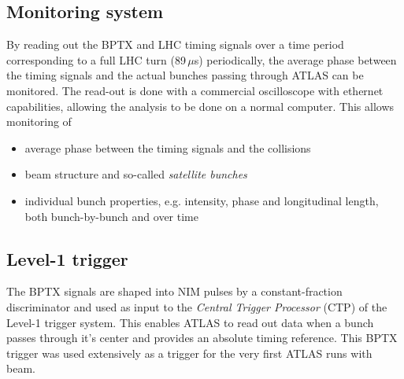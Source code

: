 \documentclass[portrait,final]{baposter}
\begin{document}
\begin{poster}
{\subsection*{Monitoring system}
By reading out the BPTX and LHC timing signals over a time period corresponding to a full LHC turn (89\,$\mu$s) periodically, the average phase between the timing signals and the actual bunches passing through ATLAS can be monitored. The read-out is done with a commercial oscilloscope with ethernet capabilities, allowing the analysis to be done on a normal computer. This allows monitoring of
\begin{itemize}
	\item \vspace{-0.5em}average phase between the timing signals and the collisions
	\item \vspace{-0.7em}beam structure and so-called \emph{satellite bunches}
	\item \vspace{-0.7em}individual bunch properties, e.g. intensity, phase and longitudinal length, both bunch-by-bunch and over time
\end{itemize}

\subsection*{Level-1 trigger}
The BPTX signals are shaped into NIM pulses by a constant-fraction discriminator and used as input to the \emph{Central Trigger Processor} (CTP) of the Level-1 trigger system. This enables ATLAS to read out data when a bunch passes through it's center and provides an absolute timing reference. This BPTX trigger was used extensively as a trigger for the very first ATLAS runs with beam.
\vspace{0.5em}

}
\end{poster}
\end{document}
